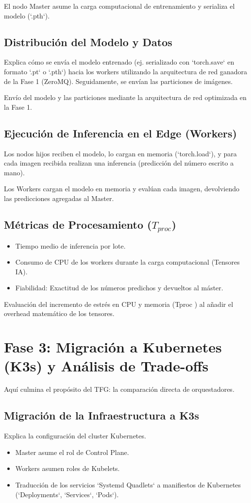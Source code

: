 \documentclass[11pt, a4paper]{report}
\begin{document}
El nodo Master asume la carga computacional de entrenamiento y serializa el modelo (`.pth`).

\section{Distribución del Modelo y Datos}
Explica cómo se envía el modelo entrenado (ej. serializado con `torch.save` en formato `.pt` o `.pth`) hacia los workers utilizando la arquitectura de red ganadora de la Fase 1 (ZeroMQ). Seguidamente, se envían las particiones de imágenes.

Envío del modelo y las particiones mediante la arquitectura de red optimizada en la Fase 1.

\section{Ejecución de Inferencia en el Edge (Workers)}
Los nodos hijos reciben el modelo, lo cargan en memoria (`torch.load`), y para cada imagen recibida realizan una inferencia (predicción del número escrito a mano). 

Los Workers cargan el modelo en memoria y evalúan cada imagen, devolviendo las predicciones agregadas al Master.

\section{Métricas de Procesamiento ($T_{proc}$)}
\begin{itemize}
    \item Tiempo medio de inferencia por lote.
    \item Consumo de CPU de los workers durante la carga computacional (Tensores IA).
    \item Fiabilidad: Exactitud de los números predichos y devueltos al máster.
\end{itemize}

Evaluación del incremento de estrés en CPU y memoria (Tproc ) al añadir el overhead matemático
de los tensores.

\chapter{Fase 3: Migración a Kubernetes (K3s) y Análisis de Trade-offs}

Aquí culmina el propósito del TFG: la comparación directa de orquestadores.

\section{Migración de la Infraestructura a K3s}
Explica la configuración del cluster Kubernetes. 
\begin{itemize}
    \item Master asume el rol de Control Plane.
    \item Workers asumen roles de Kubelets.
    \item Traducción de los servicios `Systemd Quadlets` a manifiestos de Kubernetes (`Deployments`, `Services`, `Pods`).
\end{itemize}
\end{document}
